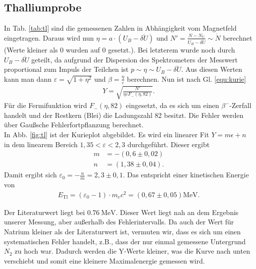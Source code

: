  \newpage

\subsection{Thalliumprobe}
In Tab. \ref{tab:tl} sind die gemessenen Zahlen in Abhängigkeit vom Magnetfeld eingetragen. Daraus wird nun $\eta = a\cdot (U_B - \overline{\delta U})$ und $N' = \frac{N - N_U}{U_B - \overline{\delta U}} \sim \dot{N}$ berechnet (Werte kleiner als 0 wurden auf 0 gesetzt.). Bei letzterem wurde noch durch $U_B - \overline{\delta U}$ geteilt, da aufgrund der Dispersion des Spektrometers der Messwert proportional zum Impuls  der Teilchen ist $p \sim \eta \sim U_B - \overline{\delta U}$. Aus diesen Werten kann man dann $\varepsilon = \sqrt{1 + \eta^2}$ und $\beta = \frac{\eta}{\varepsilon}$ berechnen. Nun ist nach Gl. \ref{equ:kurie}
\begin{align*}
Y = \sqrt{\frac{N'}{\eta\varepsilon F_{-}(\eta,82)}}.
\end{align*}
Für die Fermifunktion wird $F_{-}(\eta,82)$ eingesetzt, da es sich um einen $\beta^-$-Zerfall handelt und der Restkern (Blei) die Ladungszahl 82 besitzt. Die Fehler werden über Gaußsche Fehlerfortpflanzung berechnet.\\

In Abb. \ref{fig:tl} ist der Kurieplot abgebildet. Es wird ein linearer Fit $Y = m \epsilon + n$ in dem linearem Bereich $1,35 < \varepsilon < 2,3$ durchgeführt. Dieser ergibt
\begin{align*}
m &= -\si{(0,6\pm 0,02)}\\
n &= \si{(1,38 \pm 0,04)}.
\end{align*}
Damit ergibt sich $\varepsilon_0 = -\frac{n}{m} = 2,3 \pm 0,1$. Das entspricht einer kinetischen Energie von
\begin{align*}
E_\mathrm{Tl} = (\varepsilon_0 - 1)\cdot m_ec^2 = \si{(0,67 \pm 0,05)\mega\eV}.
\end{align*}

Der Literaturwert \cite{tlenergy} liegt bei $\SI{0,76}{\mega\eV}$. Dieser Wert liegt nah an dem Ergebnis unserer Messung, aber außerhalb des Fehlerintervalls. Da auch der Wert für Natrium kleiner als der Literaturwert ist, vermuten wir, dass es sich um einen systematischen Fehler handelt, z.B., dass der nur einmal gemessene Untergrund $N_2$ zu hoch war. Dadurch werden die Y-Werte kleiner, was die Kurve nach unten verschiebt und somit eine kleinere Maximalenergie gemessen wird.  

